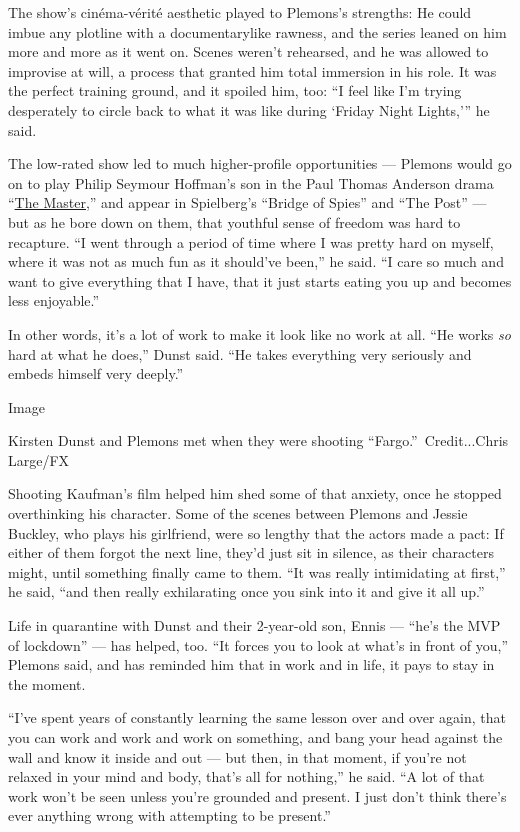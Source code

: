 The show's cinéma-vérité aesthetic played to Plemons's strengths: He
could imbue any plotline with a documentarylike rawness, and the series
leaned on him more and more as it went on. Scenes weren't rehearsed, and
he was allowed to improvise at will, a process that granted him total
immersion in his role. It was the perfect training ground, and it
spoiled him, too: ``I feel like I'm trying desperately to circle back to
what it was like during `Friday Night Lights,''' he said.

The low-rated show led to much higher-profile opportunities --- Plemons
would go on to play Philip Seymour Hoffman's son in the Paul Thomas
Anderson drama
``\href{https://www.nytimes3xbfgragh.onion/2012/09/14/movies/review-the-master-from-paul-thomas-anderson.html}{The
Master,}'' and appear in Spielberg's ``Bridge of Spies'' and ``The
Post'' --- but as he bore down on them, that youthful sense of freedom
was hard to recapture. ``I went through a period of time where I was
pretty hard on myself, where it was not as much fun as it should've
been,'' he said. ``I care so much and want to give everything that I
have, that it just starts eating you up and becomes less enjoyable.''

In other words, it's a lot of work to make it look like no work at all.
``He works \emph{so} hard at what he does,'' Dunst said. ``He takes
everything very seriously and embeds himself very deeply.''

Image

Kirsten Dunst and Plemons met when they were shooting
``Fargo.''~Credit...Chris Large/FX

Shooting Kaufman's film helped him shed some of that anxiety, once he
stopped overthinking his character. Some of the scenes between Plemons
and Jessie Buckley, who plays his girlfriend, were so lengthy that the
actors made a pact: If either of them forgot the next line, they'd just
sit in silence, as their characters might, until something finally came
to them. ``It was really intimidating at first,'' he said, ``and then
really exhilarating once you sink into it and give it all up.''

Life in quarantine with Dunst and their 2-year-old son, Ennis --- ``he's
the MVP of lockdown'' --- has helped, too. ``It forces you to look at
what's in front of you,'' Plemons said, and has reminded him that in
work and in life, it pays to stay in the moment.

``I've spent years of constantly learning the same lesson over and over
again, that you can work and work and work on something, and bang your
head against the wall and know it inside and out --- but then, in that
moment, if you're not relaxed in your mind and body, that's all for
nothing,'' he said. ``A lot of that work won't be seen unless you're
grounded and present. I just don't think there's ever anything wrong
with attempting to be present.''

